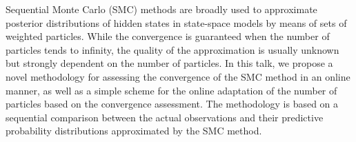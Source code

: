 Sequential Monte Carlo (SMC) methods are broadly used to
approximate posterior distributions of hidden states in state-space
models by means of sets of weighted particles. While the convergence
is guaranteed when the number of particles tends to infinity, the
quality of the approximation is usually unknown but strongly
dependent on the number of particles. In this talk, we propose a
novel methodology for assessing the convergence of the SMC method
in an online manner, as well as a simple scheme for the online
adaptation of the number of particles based on the convergence
assessment. The methodology is based on a sequential comparison
between the actual observations and their predictive probability
distributions approximated by the SMC method.